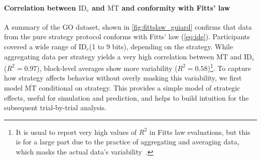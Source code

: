\documentclass[acmlarge, manuscript,review]{acmart}
\newcommand{\mmt}{\ensuremath{\overline{\mt}}\xspace}
\newcommand{\mt}{\ensuremath{{\text{MT}}}\xspace}
\newcommand{\ide}{\ensuremath{{\text{ID}_e}}\xspace}
\begin{document}
\paragraph{Correlation between \ide and \mmt and conformity with Fitts' law}
A summary of the GO dataset, shown in \autoref{fig:fittslaw_guiard} confirms that data from the pure strategy protocol conforms with Fitts' law (\autoref{eq:ide}). Participants covered a wide range of \ide (1 to 9 bits), depending on the strategy.
While aggregating data per strategy yields a very high correlation between \mmt and \ide ($R^2=0.97$), block-level averages show more variability ($R^2=0.58$)\footnote{It is usual to report very high values of $R^2$ in Fitts law evaluations, but this is for a large part due to the practice of aggregating and averaging data, which masks the actual data's variability~\cite{gori2018chi,drewes2013}.}.
To capture how strategy affects behavior without overly masking this variability, we first model \mmt conditional on strategy. This provides a simple model of strategic effects, useful for simulation and prediction, and helps to build intuition for the subsequent trial-by-trial analysis.
\end{document}
